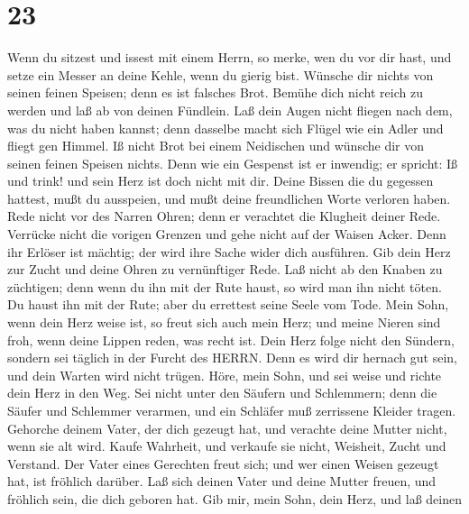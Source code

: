\hypertarget{section-22}{%
\section{23}\label{section-22}}

 Wenn du sitzest und issest mit einem Herrn, so merke, wen
du vor dir hast,  und setze ein Messer an deine Kehle, wenn
du gierig bist.  Wünsche dir nichts von seinen feinen
Speisen; denn es ist falsches Brot.  Bemühe dich nicht reich
zu werden und laß ab von deinen Fündlein.  Laß dein Augen
nicht fliegen nach dem, was du nicht haben kannst; denn dasselbe macht
sich Flügel wie ein Adler und fliegt gen Himmel.  Iß nicht
Brot bei einem Neidischen und wünsche dir von seinen feinen Speisen
nichts.  Denn wie ein Gespenst ist er inwendig; er spricht:
Iß und trink! und sein Herz ist doch nicht mit dir.  Deine
Bissen die du gegessen hattest, mußt du ausspeien, und mußt deine
freundlichen Worte verloren haben.  Rede nicht vor des
Narren Ohren; denn er verachtet die Klugheit deiner Rede. 
Verrücke nicht die vorigen Grenzen und gehe nicht auf der Waisen Acker.
 Denn ihr Erlöser ist mächtig; der wird ihre Sache wider
dich ausführen.  Gib dein Herz zur Zucht und deine Ohren zu
vernünftiger Rede.  Laß nicht ab den Knaben zu züchtigen;
denn wenn du ihn mit der Rute haust, so wird man ihn nicht töten.
 Du haust ihn mit der Rute; aber du errettest seine Seele
vom Tode.  Mein Sohn, wenn dein Herz weise ist, so freut
sich auch mein Herz;  und meine Nieren sind froh, wenn
deine Lippen reden, was recht ist.  Dein Herz folge nicht
den Sündern, sondern sei täglich in der Furcht des HERRN. 
Denn es wird dir hernach gut sein, und dein Warten wird nicht trügen.
 Höre, mein Sohn, und sei weise und richte dein Herz in den
Weg.  Sei nicht unter den Säufern und Schlemmern;
 denn die Säufer und Schlemmer verarmen, und ein Schläfer
muß zerrissene Kleider tragen.  Gehorche deinem Vater, der
dich gezeugt hat, und verachte deine Mutter nicht, wenn sie alt wird.
 Kaufe Wahrheit, und verkaufe sie nicht, Weisheit, Zucht
und Verstand.  Der Vater eines Gerechten freut sich; und
wer einen Weisen gezeugt hat, ist fröhlich darüber.  Laß
sich deinen Vater und deine Mutter freuen, und fröhlich sein, die dich
geboren hat.  Gib mir, mein Sohn, dein Herz, und laß deinen
